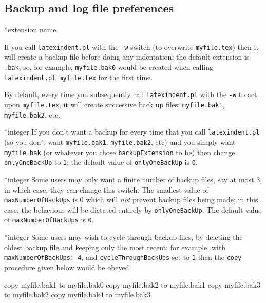 
\subsection{Backup and log file preferences}
*{extension name}

 If you call \texttt{latexindent.pl} with the \texttt{-w} switch (to overwrite
 \texttt{myfile.tex}) then it will create a backup file before doing any indentation; the
 default extension is \texttt{.bak}, so, for example, \texttt{myfile.bak0} would be
 created when calling \texttt{latexindent.pl myfile.tex} for the first time.

 By default, every time you subsequently call \texttt{latexindent.pl} with the \texttt{-w}
 to act upon \texttt{myfile.tex}, it will create successive back up files:
 \texttt{myfile.bak1}, \texttt{myfile.bak2}, etc.

*{integer}
 \label{page:onlyonebackup}
 If you don't want a backup for every time that you call \texttt{latexindent.pl} (so you
 don't want \texttt{myfile.bak1}, \texttt{myfile.bak2}, etc) and you simply want
 \texttt{myfile.bak} (or whatever you chose \texttt{backupExtension} to be) then change
 \texttt{onlyOneBackUp} to \texttt{1}; the default value of \texttt{onlyOneBackUp} is
 \texttt{0}.

*{integer}
 Some users may only want a finite number of backup files, say at most $3$, in which case,
 they can change this switch. The smallest value of \texttt{maxNumberOfBackUps} is $0$
 which will \emph{not} prevent backup files being made; in this case, the behaviour will
 be dictated entirely by \texttt{onlyOneBackUp}. The default value of
 \texttt{maxNumberOfBackUps} is \texttt{0}.

*{integer}
 Some users may wish to cycle through backup files, by deleting the oldest backup file and
 keeping only the most recent; for example, with \texttt{maxNumberOfBackUps: 4}, and
 \texttt{cycleThroughBackUps} set to \texttt{1} then the \texttt{copy} procedure given
 below would be obeyed.

 \begin{commandshell}
copy myfile.bak1 to myfile.bak0
copy myfile.bak2 to myfile.bak1
copy myfile.bak3 to myfile.bak2
copy myfile.bak4 to myfile.bak3
\end{commandshell}


